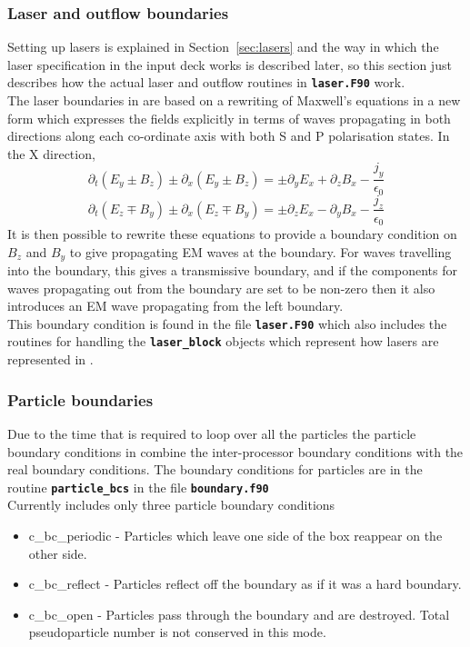 \documentclass[12pt,a4paper]{article}
\newcommand{\inlinecode}[1]{{\color{warwickred} \bf\texttt{#1}}}
\newcommand{\sect}[1]{Section~\ref{sec:#1}}
\newcommand{\EPOCH}{{\color{warwickdark}\fontfamily{phv}\selectfont{EPOCH}}}
\begin{document}
\subsubsection{Laser and outflow boundaries}
Setting up lasers is explained in \sect{lasers}
and the way in which the laser specification in the input deck works is
described later, so this section just describes how the actual laser and
outflow routines in \inlinecode{laser.F90} work.\\

The laser boundaries in {\EPOCH} are based on a rewriting of Maxwell's
equations in a new form which expresses the fields explicitly in terms of waves
propagating in both directions along each co-ordinate axis with both S and P
polarisation states. In the X direction,
\[
\partial_t(E_y \pm B_z) \pm \partial_x(E_y \pm B_z) = \pm \partial_yE_x
+ \partial_zB_x -\frac{j_y}{\epsilon_0}
\]
\[
\partial_t(E_z \mp B_y) \pm \partial_x(E_z \mp B_y) = \pm \partial_zE_x
- \partial_yB_x -\frac{j_z}{\epsilon_0}
\]
It is then possible to rewrite these equations to provide a boundary condition
on $B_z$ and $B_y$ to give propagating EM waves at the boundary. For waves
travelling into the boundary, this gives a transmissive boundary, and if the
components for waves propagating out from the boundary are set to be non-zero
then it also introduces an EM wave propagating from the left boundary.\\

This boundary condition is found in the file \inlinecode{laser.F90} which also
includes the routines for handling the \inlinecode{laser\_block} objects which
represent how lasers are represented in {\EPOCH}.

\subsubsection{Particle boundaries}
Due to the time that is required to loop over all the particles the particle
boundary conditions in {\EPOCH} combine the inter-processor boundary conditions
with the real boundary conditions. The boundary conditions for particles are in
the routine \inlinecode{particle\_bcs} in the file \inlinecode{boundary.f90} \\
Currently {\EPOCH} includes only three particle boundary conditions
\begin{itemize}
\item c\_bc\_periodic - Particles which leave one side of the box reappear on
  the other side.
\item c\_bc\_reflect - Particles reflect off the boundary as if it was a hard
  boundary.
\item c\_bc\_open - Particles pass through the boundary and are destroyed. Total
  pseudoparticle number is not conserved in this mode.
\end{itemize}
\end{document}
